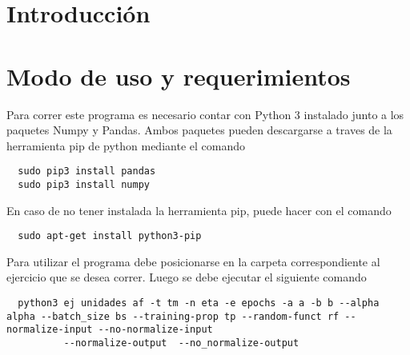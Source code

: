\section{Introducción}


\section{Modo de uso y requerimientos}
Para correr este programa es necesario contar con Python 3 instalado junto a los paquetes Numpy y Pandas. Ambos paquetes pueden descargarse a traves
de la herramienta pip de python mediante el comando
\begin{verbatim}
  sudo pip3 install pandas
  sudo pip3 install numpy
\end{verbatim}
En caso de no tener instalada la herramienta pip, puede hacer con el comando
\begin{verbatim}
  sudo apt-get install python3-pip
\end{verbatim}

Para utilizar el programa debe posicionarse en la carpeta correspondiente al ejercicio que se desea correr. Luego se debe ejecutar el siguiente comando
\begin{verbatim}
  python3 ej unidades af -t tm -n eta -e epochs -a a -b b --alpha alpha --batch_size bs --training-prop tp --random-funct rf --normalize-input --no-normalize-input
          --normalize-output  --no_normalize-output
\end{verbatim}

